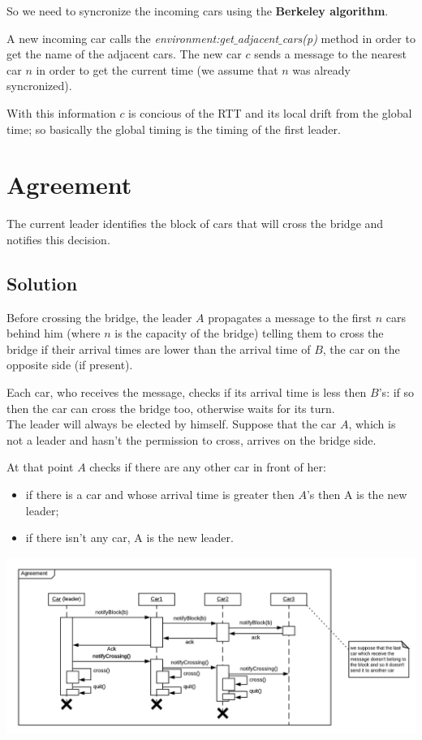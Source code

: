 So we need to syncronize the incoming cars using the \textbf{Berkeley algorithm}.

A new incoming car calls the \textit{environment:get$\_$adjacent$\_$cars(p)} 
method in order to get the name of the adjacent cars. 
The new car $c$ sends a message to the nearest car $n$ in order to get the current time 
(we assume that $n$ was already syncronized). 

With this information $c$ is concious of the RTT and its local drift from the global time;
so basically the global timing is the timing of the first leader. 


\section{Agreement}

The current leader identifies the block of cars that will cross the bridge and notifies
this decision.  

\subsection{Solution}

Before crossing the bridge, the leader $A$ propagates a message to 
the first $n$ cars behind him (where $n$ is the capacity of the bridge) 
telling them to cross the bridge if their arrival times are lower than the 
arrival time of $B$, the car on the opposite side (if present).

Each car, who receives the message, checks if its arrival time is less then $B$'s: 
if so then the car can cross the bridge too, otherwise waits for its turn.\\

\noindent
The leader will always be elected by himself. Suppose that the car $A$, 
which is not a leader and hasn't the permission to cross, arrives on the bridge side.

At that point $A$ checks if there are any other car in front of her:
\begin{itemize}
\item if there is a car and whose arrival time is greater then $A$'s then A 
    is the new leader;
\item if there isn't any car, A is the new leader.
\end{itemize}

\begin{center}
    \includegraphics[scale=0.6]{assets/ds2019_3.png}
\end{center}


